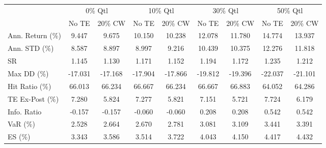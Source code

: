 \begin{tabular}{lcccccccc}
\toprule
{} & \multicolumn{2}{c}{0\% Qtl} & \multicolumn{2}{c}{10\% Qtl} & \multicolumn{2}{c}{30\% Qtl} & \multicolumn{2}{c}{50\% Qtl} \\
{} &   No TE &  20\% CW &   No TE &  20\% CW &   No TE &  20\% CW &   No TE &  20\% CW \\
\midrule
Ann. Return (\%) &   9.447 &   9.675 &  10.150 &  10.238 &  12.078 &  11.780 &  14.774 &  13.937 \\
Ann. STD (\%)    &   8.587 &   8.897 &   8.997 &   9.216 &  10.439 &  10.375 &  12.276 &  11.818 \\
SR              &   1.145 &   1.130 &   1.171 &   1.152 &   1.194 &   1.172 &   1.235 &   1.212 \\
Max DD (\%)      & -17.031 & -17.168 & -17.904 & -17.866 & -19.812 & -19.396 & -22.037 & -21.101 \\
Hit Ratio (\%)   &  66.013 &  66.234 &  66.667 &  66.234 &  66.667 &  66.883 &  64.052 &  64.286 \\
TE Ex-Post (\%)  &   7.280 &   5.824 &   7.277 &   5.821 &   7.151 &   5.721 &   7.724 &   6.179 \\
Info. Ratio     &  -0.157 &  -0.157 &  -0.060 &  -0.060 &   0.208 &   0.208 &   0.542 &   0.542 \\
VaR (\%)         &   2.528 &   2.664 &   2.670 &   2.781 &   3.081 &   3.109 &   3.441 &   3.391 \\
ES (\%)          &   3.343 &   3.586 &   3.514 &   3.722 &   4.043 &   4.150 &   4.417 &   4.432 \\
\bottomrule
\end{tabular}
